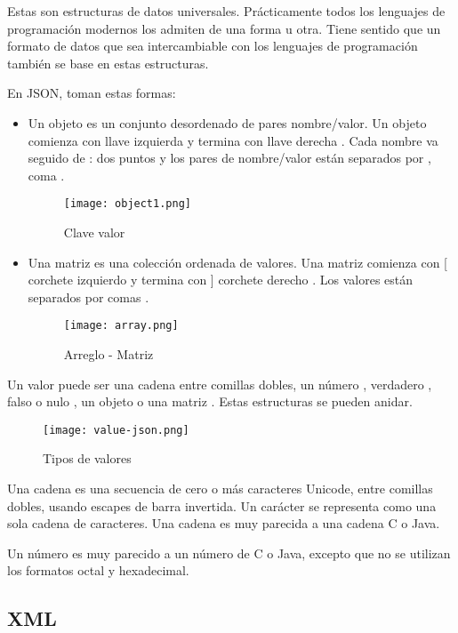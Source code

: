 \begin{enumerate}
Estas son estructuras de datos universales. Prácticamente todos los lenguajes de programación modernos los admiten de una forma u otra. Tiene sentido que un formato de datos que sea intercambiable con los lenguajes de programación también se base en estas estructuras.

En JSON, toman estas formas:

\begin{itemize}
	\item Un objeto es un conjunto desordenado de pares nombre/valor. Un objeto comienza con { llave izquierda y termina con } llave derecha . Cada nombre va seguido de : dos puntos y los pares de nombre/valor están separados por , coma .
	\begin{figure}[H]
		\center
		\texttt{[image: object1.png]}
		\caption{Clave valor}
	\end{figure}
	\item Una matriz es una colección ordenada de valores. Una matriz comienza con [ corchete izquierdo y termina con ] corchete derecho . Los valores están separados por comas .
	\begin{figure}[H]
		\center
		\texttt{[image: array.png]}
		\caption{Arreglo - Matriz}
	\end{figure}
\end{itemize}

Un valor puede ser una cadena entre comillas dobles, un número , verdadero , falso o nulo , un objeto o una matriz . Estas estructuras se pueden anidar.

	\begin{figure}[H]
	\center
	\texttt{[image: value-json.png]}
	\caption{Tipos de valores}
\end{figure}
\begin{remark}
Una cadena es una secuencia de cero o más caracteres Unicode, entre comillas dobles, usando escapes de barra invertida. Un carácter se representa como una sola cadena de caracteres. Una cadena es muy parecida a una cadena C o Java.
\end{remark}
\begin{remark}
Un número es muy parecido a un número de C o Java, excepto que no se utilizan los formatos octal y hexadecimal.
\end{remark}


\subsection{XML}


\end{enumerate}
